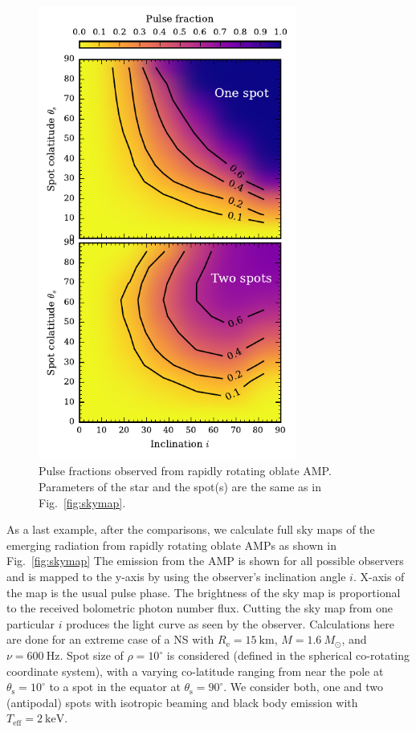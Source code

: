 \documentclass[iop, usenatbib]{emulateapj}
\newcommand{\Msun}{\ensuremath{M_{\odot}}}
\begin{document}
\begin{figure}
\includegraphics[width=8.5cm]{figs/fig8.pdf}
\caption{\label{fig:pulsefracs}
    Pulse fractions observed from rapidly rotating oblate AMP.
    Parameters of the star and the spot(s) are the same as in Fig.~\ref{fig:skymap}.
  }
\end{figure}


As a last example, after the comparisons, we calculate full sky maps of the emerging radiation from rapidly rotating oblate AMPs as shown in Fig.~\ref{fig:skymap}
The emission from the AMP is shown for all possible observers and is mapped to the y-axis by using the observer's inclination angle $i$.
X-axis of the map is the usual pulse phase.
The brightness of the sky map is proportional to the received bolometric photon number flux.
Cutting the sky map from one particular $i$ produces the light curve as seen by the observer.
Calculations here are done for an extreme case of a NS with $R_{\mathrm{e}} = 15~\mathrm{km}$, $M=1.6~\Msun$, and $\nu = 600~\mathrm{Hz}$.
Spot size of $\rho = 10^{\circ}$ is considered (defined in the spherical co-rotating coordinate system), with a varying co-latitude ranging from near the pole at $\theta_{\mathrm{s}} = 10^{\circ}$ to a spot in the equator at $\theta_{\mathrm{s}} = 90^{\circ}$.
We consider both, one and two (antipodal) spots with isotropic beaming and black body emission with $T_{\mathrm{eff}} = 2~\mathrm{keV}$.
\end{document}
